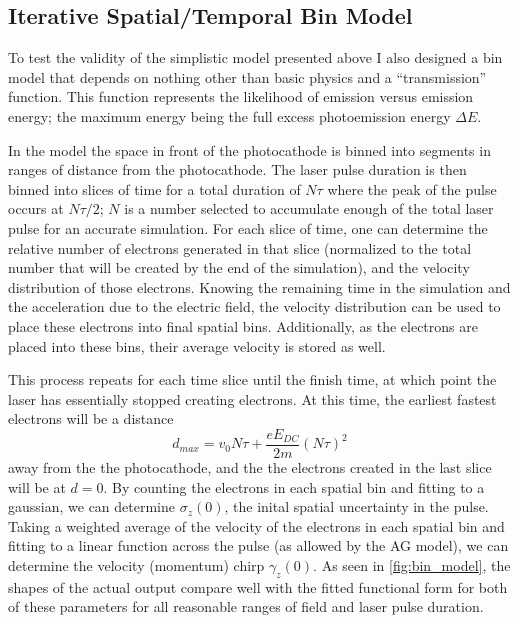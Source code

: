 \subsection{Iterative Spatial/Temporal Bin Model} \label{sec:bin_model}

To test the validity of the simplistic model presented above I also designed a bin model that depends on nothing other than basic physics and a ``transmission'' function.
This function represents the likelihood of emission versus emission energy; the maximum energy being the full excess photoemission energy $\Delta E$.

In the model the space in front of the photocathode is binned into segments in ranges of distance from the photocathode.
The laser pulse duration is then binned into slices of time for a total duration of $N \tau$ where the peak of the pulse occurs at $N \tau / 2$; $N$ is a number selected to accumulate enough of the total laser pulse for an accurate simulation.
For each slice of time, one can determine the relative number of electrons generated in that slice (normalized to the total number that will be created by the end of the simulation), and the velocity distribution of those electrons.
Knowing the remaining time in the simulation and the acceleration due to the electric field, the velocity distribution can be used to place these electrons into final spatial bins.
Additionally, as the electrons are placed into these bins, their average velocity is stored as well.

This process repeats for each time slice until the finish time, at which point the laser has essentially stopped creating electrons.
At this time, the earliest fastest electrons will be a distance 
\begin{equation}
  d_{max} = v_0 N \tau + \frac{e E_{ DC }}{2 m} (N \tau)^2 
\end{equation}
away from the the photocathode, and the the electrons created in the last slice will be at $d=0$.
By counting the electrons in each spatial bin and fitting to a gaussian, we can determine $\sigma_z(0)$, the inital spatial uncertainty in the pulse.
Taking a weighted average of the velocity of the electrons in each spatial bin and fitting to a linear function across the pulse (as allowed by the AG model), we can determine the velocity (momentum) chirp $\gamma_z(0)$.
As seen in \ref{fig:bin_model}, the shapes of the actual output compare well with the fitted functional form for both of these parameters for all reasonable ranges of field and laser pulse duration.

